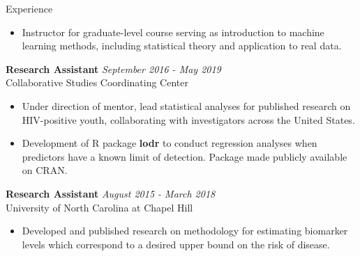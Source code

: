 \documentclass{resume} %
\begin{document}
\begin{rSection}{Experience}
\begin{itemize}
    \item Instructor for graduate-level course serving as introduction to machine learning methods, including statistical theory and application to real data.
\end{itemize}
{\bf Research Assistant} \hfill {\em September 2016 - May 2019} 
\\ Collaborative Studies Coordinating Center
\begin{itemize}
    \item Under direction of mentor, lead statistical analyses for published research on HIV-positive youth, collaborating with investigators across the United States.
    \item Development of R package \textbf{lodr} to conduct regression analyses when predictors have a known limit of detection.  Package made publicly available on CRAN.
\end{itemize}
{\bf Research Assistant} \hfill {\em August 2015 - March 2018} 
\\ University of North Carolina at Chapel Hill
\begin{itemize}
    \item Developed and published research on methodology for estimating biomarker levels which correspond to a desired upper bound on the risk of disease.
\end{itemize}

\end{rSection}



\end{document}
